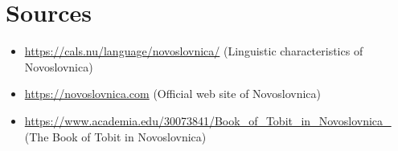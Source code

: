 \chapter{Sources}

\begin{itemize}
	\item \url{https://cals.nu/language/novoslovnica/} (Linguistic characteristics of Novoslovnica)
	\item \url{https://novoslovnica.com} (Official web site of Novoslovnica)
	\item \url{https://www.academia.edu/30073841/Book_of_Tobit_in_Novoslovnica_} (The Book of Tobit in Novoslovnica)
\end{itemize}
